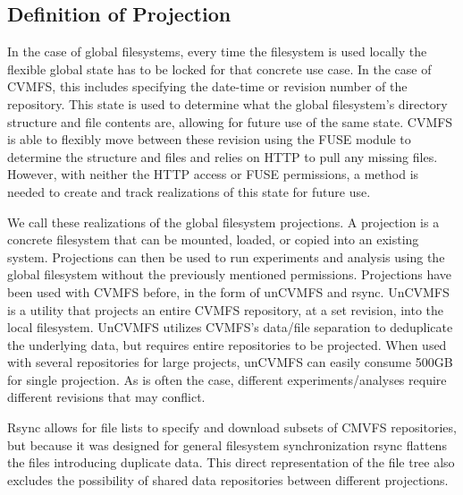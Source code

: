 \documentclass[conference]{IEEEtran}
\begin{document}
\subsection{Definition of Projection}

In the case of global filesystems,
every time the filesystem is used locally
the flexible global state has to be 
locked for that concrete use case.
In the case of CVMFS,
this includes specifying the date-time
or revision number of the repository.
This state is used to determine 
what the global filesystem's directory
structure and file contents are, 
allowing for future use of the same state.
CVMFS is able to flexibly move
between these revision using the FUSE module
to determine the structure and files and
relies on HTTP to pull any missing files.
However, with neither the HTTP access or
FUSE permissions, a method is needed to 
create and track realizations of this
state for future use.

We call these realizations of the global filesystem
projections.
A projection is a concrete filesystem that can be
mounted, loaded, or copied into an existing system.
Projections can then be used to run experiments
and analysis using the global filesystem without
the previously mentioned permissions.
Projections have been used with CVMFS before,
in the form of unCVMFS and rsync.
UnCVMFS is a utility that projects an entire
CVMFS repository, at a set revision, into the local
filesystem. 
UnCVMFS utilizes CVMFS's data/file separation
to deduplicate the underlying data, but requires
entire repositories to be projected.
When used with several repositories for large projects,
unCVMFS can easily consume 500GB for single projection.
As is often the case, different experiments/analyses 
require different revisions that may conflict.

Rsync allows for file lists to specify and download
subsets of CMVFS repositories, but because it
was designed for general filesystem synchronization
rsync flattens the files introducing duplicate data.
This direct representation of the file tree also
excludes the possibility of shared data repositories
between different projections.

\end{document}
